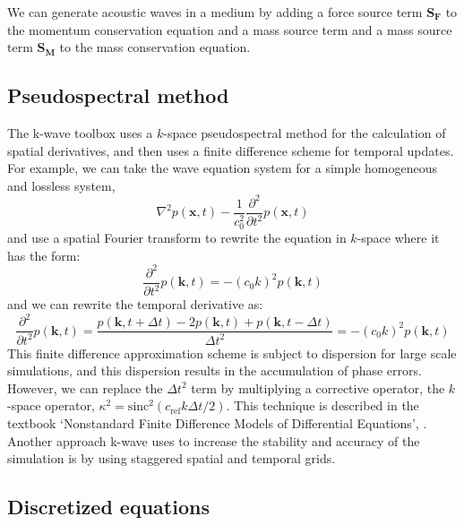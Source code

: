 \documentclass[10pt,a4paper]{article}
\begin{document}
We can generate acoustic waves in a medium by adding a force source term \textbf{S$_\textbf{F}$} to the momentum conservation equation and a mass source term and a mass source term \textbf{S$_\textbf{M}$} to the mass conservation equation.

\subsection{Pseudospectral method}

The k-wave toolbox uses a $k$-space pseudospectral method for the calculation of spatial derivatives, and then uses a finite difference scheme for temporal updates. For example, we can take the wave equation system for a simple homogeneous and lossless system,
\begin{equation}
\nabla^2 p (\textbf{x},t) - \dfrac{1}{c_0^2} \dfrac{\partial^2}{\partial t^2} p (\textbf{x},t)
\end{equation}
and use a spatial Fourier transform to rewrite the equation in $k$-space where it has the form:
\begin{equation}
\frac{\partial^2}{\partial t^2} p(\textbf{k},t) = - (c_0 k)^2 p(\textbf{k},t)
\end{equation}
and we can rewrite the temporal derivative as:
\begin{equation}
\frac{\partial^2}{\partial t^2} p(\textbf{k},t) = \dfrac{p(\textbf{k},t+\Delta t) - 2p(\textbf{k},t)+p(\textbf{k}, t-\Delta t)}{\Delta t^2} = - (c_0 k)^2 p(\textbf{k},t)
\end{equation}
This finite difference approximation scheme is subject to dispersion for large scale simulations, and this dispersion results in the accumulation of phase errors. However, we can replace the $\Delta t^2$ term by multiplying a corrective operator, the $k$-space operator, $\kappa^2 = \text{sinc}^2(c_{\text{ref}} k \Delta t/2)$. This technique is described in the textbook `Nonstandard Finite Difference Models of Differential Equations', \cite{mickens1993nonstandard}. Another approach k-wave uses to increase the stability and accuracy of the simulation is by using staggered spatial and temporal grids. 

\subsection{Discretized equations}
\end{document}
